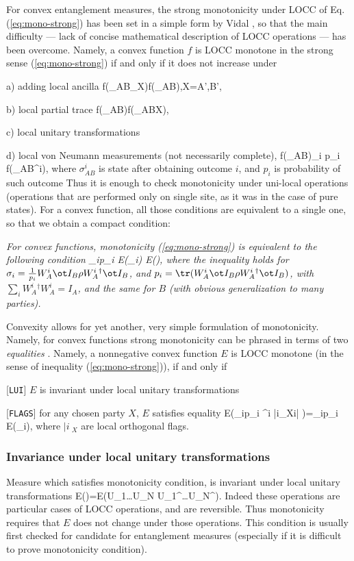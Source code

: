 \documentclass[twocolumn,aps,rmp]{revtex4}
\begin{document}
For convex entanglement measures, the strong monotonicity under LOCC
of Eq. (\ref{eq:mono-strong}) has been set in a simple form by Vidal
\cite{Vidal-mon2000}, so that the main difficulty --- lack of concise
mathematical description of LOCC operations --- has been overcome.
Namely, a convex function $f$ is LOCC monotone in the strong sense
(\ref{eq:mono-strong}) if and only if it does not increase under
\bei
\item[a)] adding local ancilla
\be
f(\rho_{AB}\ot \sigma_X)\leq f(\rho_{AB}),\quad X=A',B',
\ee
\item[b)] local partial trace
\be
f(\rho_{AB})\leq f(\rho_{ABX}),
\ee
\item[c)] local unitary transformations
\item[d)] local von Neumann measurements (not necessarily complete),
\be
f(\rho_{AB})\geq \sum_i p_i f(\sigma_{AB}^i),
\ee
where $\sigma_{AB}^i$ is state after obtaining outcome $i$,
and $p_i$ is probability of such outcome
\eei
Thus it is enough to check monotonicity under uni-local operations
(operations that are performed only on  single  site, as it was in the case of pure states).
For a convex function, all those conditions are equivalent
to a single one, so that we obtain a compact condition:

{\it For convex functions, monotonicity
(\ref{eq:mono-strong}) is equivalent to the following condition \be
\sum_ip_i E(\sigma_i) \leq E(\rho), \label{eq:mono-unilocal} \ee
where the inequality holds for $\sigma_i=\frac{1}{p_i}W_A^i \ot I_B
\rho W_A^i{}^\dagger\ot I_B$, and $p_i={\tr}(W_A^i \ot I_B \rho
W_A^i{}^\dagger\ot I_B)$, with $\sum_i W_A^i{}^\dagger W_A^i=I_A$,
and the same for $B$ (with obvious generalization to many parties).
}


Convexity allows for yet another, very simple formulation of monotonicity.
Namely, for convex functions strong monotonicity can be phrased in
terms of two {\it equalities} \cite{MH2004-mono}. Namely, a nonnegative
convex function $E$ is LOCC monotone (in the sense of inequality (\ref{eq:mono-strong})),
if and only if
\bei
\item{}[{\tt LUI}] $E$ is invariant under local unitary transformations
\item{}[{\tt FLAGS}] for any chosen party $X$,  $E$ satisfies equality
\be
E\bigl(\sum_ip_i \rho^i \ot |i\>_X\<i| \bigr)=\sum_ip_i E(\rho_i),
\ee
where $|i\>_X$ are local orthogonal flags.
\eei

\subsubsection{Invariance under local unitary transformations}
Measure which satisfies monotonicity condition,
is invariant under local unitary transformations
\be
E(\rho)=E(U_1\ot \ldots U_N \rho U_1^\dagger\ot \ldots U_N^\dagger).
\ee
Indeed these operations are particular cases of LOCC operations,
and are reversible. Thus monotonicity requires that $E$ does not change  under
those operations. This condition is usually first checked for candidate for
entanglement measures (especially if it is difficult to prove
monotonicity condition).
\end{document}
